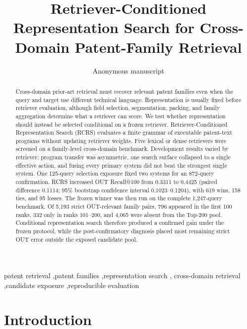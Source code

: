 \documentclass[final,5p,times,twocolumn]{elsarticle}
\newcommand{\RCRS}{RCRS}
\begin{document}
\begin{frontmatter}

\title{Retriever-Conditioned Representation Search for Cross-Domain Patent-Family Retrieval}

\author{Anonymous manuscript}

\begin{abstract}
Cross-domain prior-art retrieval must recover relevant patent families even
when the query and target use different technical language. Representation is
usually fixed before retriever evaluation, although field selection,
segmentation, packing, and family aggregation determine what a retriever can
score. We test whether representation should instead be selected conditional
on a frozen retriever. Retriever-Conditioned Representation Search (\RCRS{})
evaluates a finite grammar of executable patent-text programs without updating
retriever weights. Five lexical or dense retrievers were screened on a
family-level cross-domain benchmark. Development results varied by retriever:
program transfer was asymmetric, one search surface collapsed to a single
effective action, and fusing every primary system did not beat the strongest
single system. One 125-query selection exposure fixed two systems for an
872-query confirmation. \RCRS{} increased OUT Recall@100 from 0.3311 to
0.4425 (paired difference 0.1114; 95\% bootstrap confidence interval
0.1023--0.1204), with 619 wins, 158 ties, and 95 losses. The frozen winner was
then run on the complete 1,247-query benchmark. Of 5,193 strict OUT-relevant
family pairs, 796 appeared in the first 100 ranks, 332 only in ranks 101--200,
and 4,065 were absent from the Top-200 pool. Conditional representation search
therefore produced a confirmed gain under the frozen protocol, while the
post-confirmatory diagnosis placed most remaining strict OUT error outside the
exposed candidate pool.
\end{abstract}

\begin{keyword}
patent retrieval \sep patent families \sep representation search \sep
cross-domain retrieval \sep candidate exposure \sep reproducible evaluation
\end{keyword}

\end{frontmatter}

\section{Introduction}
\end{document}
